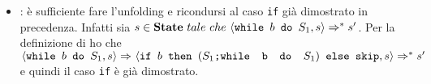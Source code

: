 {\begin{itemize}
\begin{itemize}
		\item $\mathbb{B}[b]_s=ff$: è analogo al precedente. Nel caso in cui la
		valutazione della guardia nello stato $s$ si falsa, allora 
		$\confSs{\ifABC{b}{S_1}{S_2}}{s}\Rar{}\confSs{S_2}{s}$ sul quale so che
		vale l'ipotesi induttiva, poichè per ipotesi 
		$\confSs{\ifABC{b}{S_1}{S_2}}{s}\Rar{*}s'$, di conseguenza $\exists~k\in
		\mathbb{N}~tale~che~\confSs{\ifABC{b}{S_1}{S_2}}{s}\Rar{k}s'$ e quindi 
		$\confSs{\ifABC{b}{S_1}{S_2}}{s}\Rar{}\confSs{S_2}{s}\Rar{k-1}s'$. \\
		Sia $y\notin\lvar{\ifABC{b}{$S_1$}{$S_2$}}$ allora, per definizione di 
		\texttt{lvar}, $y\notin\lvar{$S_1$} \cup \lvar{$S_2$}$ e quindi in
		particolare $y\notin\lvar{$S_2$}$. Per ipotesi induttiva vale quindi
		$s(y)=s'(y)$.
		\end{itemize}

	\item {}: è sufficiente fare l'unfolding e
	ricondursi al caso \texttt{if} già dimostrato in precedenza. Infatti sia 
	$s\in\mbox{\textbf{State}}~tale~che~\langle{}\mbox{\normalfont{\texttt{while }}} b \textrm{\normalfont{\texttt{ do }}} S_1, s\rangle{}\Rightarrow^{*}s'$. Per la definizione
	di \whileSOS{} ho che $\langle{}\mbox{\normalfont{\texttt{while }}} b \textrm{\normalfont{\texttt{ do }}} S_1, s\rangle{}\Rightarrow^{}
	\langle{}\mbox{\normalfont{\texttt{if }}} b \textrm{\normalfont{\texttt{ then }}} (\textrm{\normalfont{\texttt{$S_1$;\mbox{\normalfont{\texttt{while }}} b \textrm{\normalfont{\texttt{ do }}} $S_1$}}}) \textrm{\normalfont{\texttt{ else }}} \textrm{\normalfont{\texttt{skip}}}, s\rangle{}\Rightarrow^{*}s'$
	e quindi il caso \texttt{if} è già dimostrato.
	\end{itemize}
}

\newpage